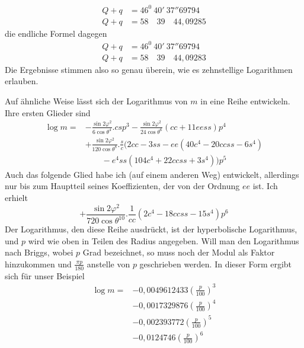 \[
\begin{aligned}
Q+q&=46^0\ 40'\ 37''69794\\
Q+q&=58\quad39\quad44{,}09285
\end{aligned}
\]
die endliche Formel dagegen
\[
\begin{aligned}
Q+q&=46^0\ 40'\ 37''69794\\
Q+q&=58\quad39\quad44{,}09283
\end{aligned}
\]
Die Ergebnisse stimmen also so genau überein, wie es zehnstellige Logarithmen erlauben.

\indent Auf ähnliche Weise lässt sich der Logarithmus von \(m\) in eine Reihe entwickeln. Ihre ersten Glieder sind
\[
\begin{aligned}
\log m={}&-\frac{\sin2\varphi^2}{6\cos\theta^4}\mathord{.}csp^3-\frac{\sin2\varphi^2}{24\cos\theta^6}(cc+11eess)p^4\\
&+\frac{\sin2\varphi^2}{120\cos\theta^8}\mathord{.}\frac{s}{c}(2cc-3ss-ee(40c^4-20ccss-6s^4)\\
&\qquad-e^4ss(104c^4+22ccss+3s^4))p^5
\end{aligned}
\]
Auch das folgende Glied habe ich (auf einem anderen Weg) entwickelt, allerdings nur bis zum Hauptteil seines Koeffizienten, der von der Ordnung \(ee\) ist. Ich erhielt
\[
+\frac{\sin2\varphi^2}{720\cos\theta^{10}}\mathord{.}\frac{1}{cc}(2c^4-18ccss-15s^4)p^6
\]
\indent Der Logarithmus, den diese Reihe ausdrückt, ist der hyperbolische Logarithmus, und \(p\) wird wie oben in Teilen des Radius angegeben. Will man den Logarithmus nach Briggs, wobei \(p\) Grad bezeichnet, so muss noch der Modul als Faktor hinzukommen und \(\tfrac{\pi p}{180}\) anstelle von \(p\) geschrieben werden. In dieser Form ergibt sich für unser Beispiel
\[
\begin{aligned}
\log m={}&-0{,}0049612433(\frac{p}{100})^3\\
&-0{,}0017329876(\frac{p}{100})^4\\
&-0{,}002393772(\frac{p}{100})^5\\
&-0{,}0124746(\frac{p}{100})^6
\end{aligned}
\]
